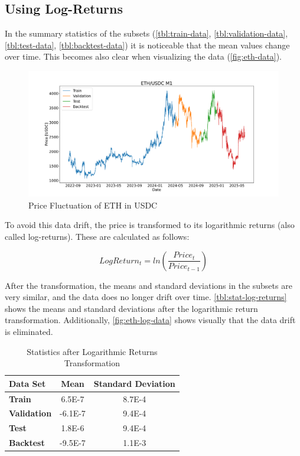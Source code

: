 \subsection{Using Log-Returns}
\label{chap:log-returns}

In the summary statistics of the subsets (\autoref{tbl:train-data}, \autoref{tbl:validation-data}, \autoref{tbl:test-data}, \autoref{tbl:backtest-data}) it is noticeable that the mean values change over time.
This becomes also clear when visualizing the data (\autoref{fig:eth-data}).

\begin{figure}[H]
    \centering
    \includegraphics[width=\textwidth]{images/eda/ethusdc_price}
    \caption{Price Fluctuation of ETH in USDC}
    \label{fig:eth-data}
\end{figure}

\noindent
To avoid this data drift, the price is transformed to its logarithmic returns (also called log-returns).
These are calculated as follows:

\[
    LogReturn_t = ln(\frac{Price_t}{Price_{t-1}})
\]

\noindent
After the transformation, the means and standard deviations in the subsets are very similar, and the data does no longer drift over time.
\autoref{tbl:stat-log-returns} shows the means and standard deviations after the logarithmic return transformation.
Additionally, \autoref{fig:eth-log-data} shows visually that the data drift is eliminated.

\begin{table}[H]
    \centering
    \begin{tabular}{L{3cm}cc}
        \toprule
        \textbf{Data Set}   & Mean    & Standard Deviation \\
        \midrule
        \textbf{Train}      & 6.5E-7  & 8.7E-4             \\
        \textbf{Validation} & -6.1E-7 & 9.4E-4             \\
        \textbf{Test}       & 1.8E-6  & 9.4E-4             \\
        \textbf{Backtest}   & -9.5E-7 & 1.1E-3             \\
        \bottomrule
    \end{tabular}
    \caption{Statistics after Logarithmic Returns Transformation}
    \label{tbl:stat-log-returns}
\end{table}

